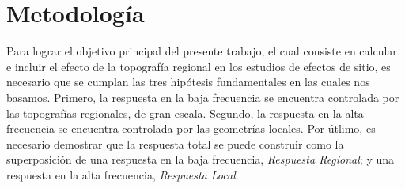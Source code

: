 \documentclass[spanish,letterpaper,12pt,twoside,openany]{article}
\begin{document}
\section{Metodología}
\label{metodologia}
%
Para lograr el objetivo principal del presente trabajo, el cual consiste en calcular e incluir el efecto de la topografía regional en los estudios de efectos de sitio, es necesario que se cumplan las tres hipótesis fundamentales en las cuales nos basamos. Primero, la respuesta en la baja frecuencia se encuentra controlada por las topografías regionales, de gran escala. Segundo, la respuesta en la alta frecuencia se encuentra controlada por las geometrías locales. Por útlimo, es necesario demostrar que la respuesta total se puede construir como la superposición de una respuesta en la baja frecuencia, \textit{Respuesta Regional}; y una respuesta en la alta frecuencia, \textit{Respuesta Local}.
\end{document}

